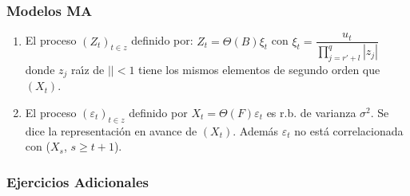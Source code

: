 \subsubsection*{Modelos MA}

\begin{enumerate}[resume]
\item El proceso $(Z_{t} )_{t\in z} $ definido por: $Z_{t} =\Theta \left( B \right)\xi_{t} $ con $\displaystyle\xi_{t} =\dfrac{u_{t} }{\prod_{j=r'+l}^{q} \left| z_{j}\right| } $ donde $z_{j}$ ra\'{\i}z de $\left| \right|<1$ tiene los mismos elementos de segundo orden que $(X_{t})$.

\item El proceso $(\varepsilon_{t} )_{t\in z} $ definido por $X_{t} =\Theta \left( F \right)\varepsilon_{t} $ es r.b. de varianza $\sigma^{2}$. Se dice la representaci\'{o}n en avance de $(X_{{t}})$. Adem\'{a}s $\varepsilon_{t} $ no est\'{a} correlacionada con ($X_{s}$, $s\ge t+1$).
\end{enumerate}

\subsubsection*{Ejercicios Adicionales}


